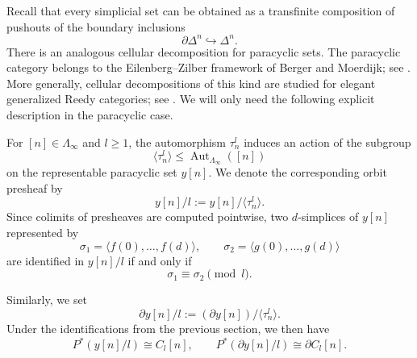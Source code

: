 \documentclass{article}
\theoremstyle{plain}
\theoremstyle{definition}
\theoremstyle{remark}
\begin{document}
Recall that every simplicial set can be obtained as a transfinite
composition of pushouts of the boundary inclusions
\[
\partial\Delta^n\hookrightarrow\Delta^n.
\]
There is an analogous cellular decomposition for paracyclic sets.
The paracyclic category belongs to the Eilenberg--Zilber framework of
Berger and Moerdijk; see \cite[Section~6]{BM2011}. More generally,
cellular decompositions of this kind are studied for elegant generalized
Reedy categories; see \cite[Theorem~5.46]{CaSa2025}. We will only need
the following explicit description in the paracyclic case.

For $[n]\in\Lambda_\infty$ and $l\geq1$, the automorphism
$\tau_n^l$ induces an action of the subgroup
\[
\langle\tau_n^l\rangle
\leq
\operatorname{Aut}_{\Lambda_\infty}([n])
\]
on the representable paracyclic set $y[n]$. We denote the corresponding
orbit presheaf by
\[
y[n]/l
:=
y[n]/\langle\tau_n^l\rangle.
\]
Since colimits of presheaves are computed pointwise, two $d$-simplices
of $y[n]$ represented by
\[
\sigma_1=\langle f(0),\ldots,f(d)\rangle,
\qquad
\sigma_2=\langle g(0),\ldots,g(d)\rangle
\]
are identified in $y[n]/l$ if and only if
\[
\sigma_1\equiv\sigma_2\pmod l.
\]

Similarly, we set
\[
\partial y[n]/l
:=
(\partial y[n])/\langle\tau_n^l\rangle.
\]
Under the identifications from the previous section, we then have
\begin{equation}\label{eq:repOfCycles}
P^*(y[n]/l)\cong C_l[n],
\qquad
P^*(\partial y[n]/l)\cong\partial C_l[n].
\end{equation}
\end{document}
